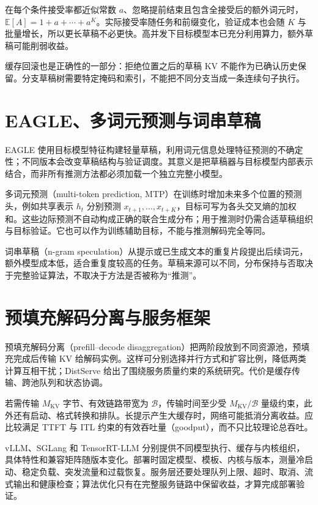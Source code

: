在每个条件接受率都近似常数 $a$、忽略提前结束且包含全接受后的额外词元时，$\mathbb E[A]=1+a+\cdots+a^K$。实际接受率随任务和前缀变化，验证成本也会随 $K$ 与批量增长，所以更长草稿不必更快。高并发下目标模型本已充分利用算力，额外草稿可能削弱收益。

缓存回滚也是正确性的一部分：拒绝位置之后的草稿 KV 不能作为已确认历史保留。分支草稿树需要特定掩码和索引，不能把不同分支当成一条连续句子执行。

\section{EAGLE、多词元预测与词串草稿}

EAGLE 使用目标模型特征构建轻量草稿，利用词元信息处理特征预测的不确定性；不同版本会改变草稿结构与验证调度\cite{eagle}。其意义是把草稿器与目标模型内部表示结合，而非所有推测方法都必须加载一个独立完整小模型。

多词元预测（multi-token prediction, MTP）在训练时增加未来多个位置的预测头，例如共享表示 $h_t$ 分别预测 $x_{t+1},\ldots,x_{t+K}$，目标可写为各头交叉熵的加权和\cite{mtp}。这些边际预测不自动构成正确的联合生成分布；用于推测时仍需合适草稿组织与目标验证。它也可以作为训练辅助目标，不能与推测解码完全等同。

词串草稿（n-gram speculation）从提示或已生成文本的重复片段提出后续词元，额外模型成本低，适合重复度较高的任务。草稿来源可以不同，分布保持与否取决于完整验证算法，不取决于方法是否被称为“推测”。

\section{预填充解码分离与服务框架}

预填充解码分离（prefill--decode disaggregation）把两阶段放到不同资源池，预填充完成后传输 KV 给解码实例。这样可分别选择并行方式和扩容比例，降低两类计算互相干扰；DistServe 给出了围绕服务质量约束的系统研究\cite{distserve}。代价是缓存传输、跨池队列和状态协调。

若需传输 $M_{\mathrm{KV}}$ 字节、有效链路带宽为 $\mathcal B$，传输时间至少受 $M_{\mathrm{KV}}/\mathcal B$ 量级约束，此外还有启动、格式转换和排队。长提示产生大缓存时，网络可能抵消分离收益。应比较满足 TTFT 与 ITL 约束的有效吞吐量（goodput），而不只比较理论总吞吐。

vLLM、SGLang 和 TensorRT-LLM 分别提供不同模型执行、缓存与内核组织，具体特性和兼容矩阵随版本变化\cite{vllm,sglang,trt}。部署时固定模型、模板、内核与版本，测量冷启动、稳定负载、突发流量和过载恢复。服务层还要处理队列上限、超时、取消、流式输出和健康检查；算法优化只有在完整服务链路中保留收益，才算完成部署验证。

